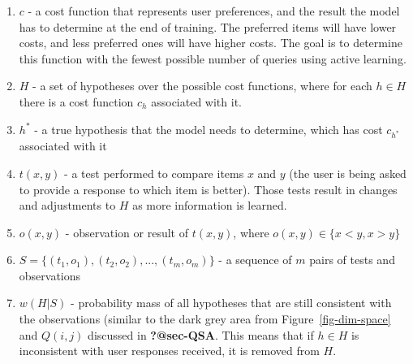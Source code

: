 \documentclass[
  letterpaper,
  numbers=noenddot,
  DIV=11]{scrreprt}
\theoremstyle{plain}
\theoremstyle{definition}
\theoremstyle{plain}
\theoremstyle{remark}
\begin{document}
\begin{enumerate}
\def\labelenumi{\arabic{enumi}.}
\item
  \(c\) - a cost function that represents user preferences, and the
  result the model has to determine at the end of training. The
  preferred items will have lower costs, and less preferred ones will
  have higher costs. The goal is to determine this function with the
  fewest possible number of queries using active learning.
\item
  \(H\) - a set of hypotheses over the possible cost functions, where
  for each \(h \in H\) there is a cost function \(c_h\) associated with
  it.
\item
  \(h^*\) - a true hypothesis that the model needs to determine, which
  has cost \(c_{h^*}\) associated with it
\item
  \(t(x,y)\) - a test performed to compare items \(x\) and \(y\) (the
  user is being asked to provide a response to which item is better).
  Those tests result in changes and adjustments to \(H\) as more
  information is learned.
\item
  \(o(x,y)\) - observation or result of \(t(x,y)\), where
  \(o(x,y) \in \{x<y, x>y\}\)
\item
  \(S = \{(t_1, o_1), (t_2, o_2),...,(t_m, o_m)\}\) - a sequence of
  \(m\) pairs of tests and observations
\item
  \(w(H|S)\) - probability mass of all hypotheses that are still
  consistent with the observations (similar to the dark grey area from
  Figure~\ref{fig-dim-space} and \(Q(i,j)\) discussed in
  \textbf{?@sec-QSA}. This means that if \(h \in H\) is inconsistent
  with user responses received, it is removed from \(H\).
\end{enumerate}
\end{document}
